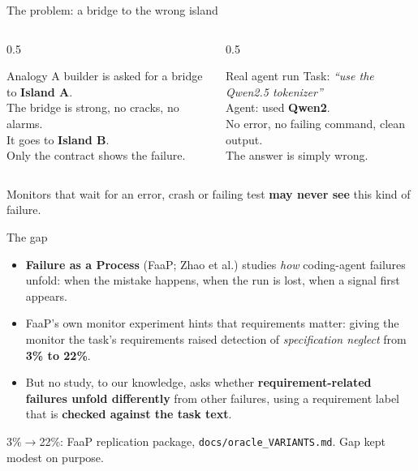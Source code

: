 \documentclass[aspectratio=169,11pt]{beamer}
\newcommand{\fine}[1]{{\scriptsize\color{gray}#1}}
\begin{document}
\begin{frame}{The problem: a bridge to the wrong island}
  \begin{columns}[T]
    \begin{column}{0.5\textwidth}
      \begin{block}{Analogy}
        A builder is asked for a bridge to \textbf{Island A}.\\
        The bridge is strong, no cracks, no alarms.\\
        It goes to \textbf{Island B}.\\[4pt]
        Only the \alert{contract} shows the failure.
      \end{block}
    \end{column}
    \begin{column}{0.5\textwidth}
      \begin{block}{Real agent run}
        Task: \emph{``use the Qwen2.5 tokenizer''}\\
        Agent: used \textbf{Qwen2}.\\
        No error, no failing command, clean output.\\[4pt]
        The answer is simply \alert{wrong}.
      \end{block}
    \end{column}
  \end{columns}
  \vfill
  \centering Monitors that wait for an error, crash or failing test \textbf{may never see} this kind of failure.
\end{frame}

\begin{frame}{The gap}
  \begin{itemize}
    \item \textbf{Failure as a Process} (FaaP; Zhao et al.) studies \emph{how} coding-agent failures unfold:
      when the mistake happens, when the run is lost, when a signal first appears.
    \item FaaP's own monitor experiment hints that requirements matter:
      giving the monitor the task's requirements raised detection of \emph{specification neglect}
      from \textbf{3\% to 22\%}.
    \item But no study, to our knowledge, asks whether \textbf{requirement-related failures unfold differently}
      from other failures, using a requirement label that is \textbf{checked against the task text}.
  \end{itemize}
  \vfill
  \fine{3\%$\rightarrow$22\%: FaaP replication package, \texttt{docs/oracle\_VARIANTS.md}. Gap kept modest on purpose.}
\end{frame}
\end{document}
